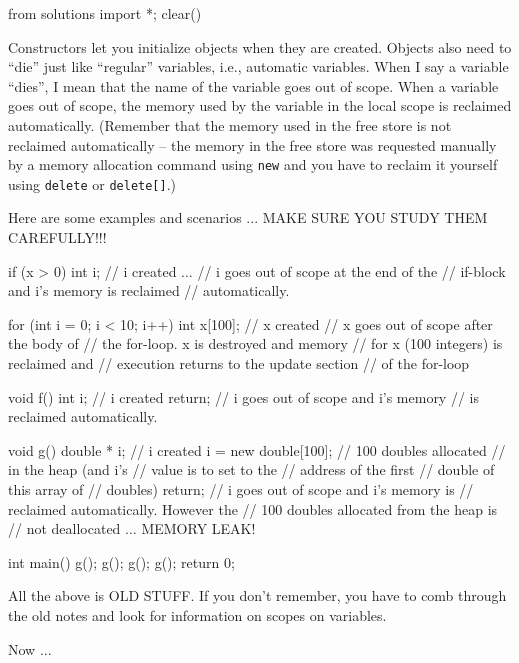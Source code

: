 \begin{python0}
from solutions import *; clear()
\end{python0}

Constructors let you initialize objects when they are created. Objects
also need to ``die'' just like ``regular'' variables, i.e., automatic
variables. When I say a variable ``dies'', I mean that the name of the
variable goes out of scope. When a variable goes out of scope, the
memory used by the variable in the local scope is reclaimed
automatically. (Remember that the memory used in the free store is not
reclaimed automatically -- the memory in the free store was requested
manually by a memory allocation command using \texttt{new} and you have to
reclaim it yourself using \texttt{delete} or \texttt{delete[]}.)

Here are some examples and scenarios ... MAKE SURE YOU STUDY THEM
CAREFULLY!!!

\begin{consolethree}[escapeinside=||]
if (x > 0)
{
    int i; // i created
    ...
} // i goes out of scope at the end of the
  // if-block and i's memory is reclaimed
  // automatically.
\end{consolethree}

\begin{consolethree}[escapeinside=||]
for (int i = 0; i < 10; i++)
{
    int x[100]; // x created
} // x goes out of scope after the body of
  // the for-loop. x is destroyed and memory
  // for x (100 integers) is reclaimed and
  // execution returns to the update section
  // of the for-loop
\end{consolethree}

\begin{consolethree}[escapeinside=||]
void f()
{
    int i; // i created
    return; // i goes out of scope and i's memory
            // is reclaimed automatically.
}
\end{consolethree}

\begin{consolethree}[escapeinside=||]
void g()
{
    double * i; // i created
    i = new double[100]; // 100 doubles allocated
                         // in the heap (and i's
                         // value is to set to the
                         // address of the first
                         // double of this array of
                         // doubles)
    return; // i goes out of scope and i's memory is
            // reclaimed automatically. However the
            // 100 doubles allocated from the heap is
            // not deallocated ... MEMORY LEAK!
}

int main()
{
    g();
    g();
    g();
    g();
    return 0;
}
\end{consolethree}

All the above is OLD STUFF. If you don't remember, you
have to comb through the old notes and look for information on scopes on
variables.

Now ...


